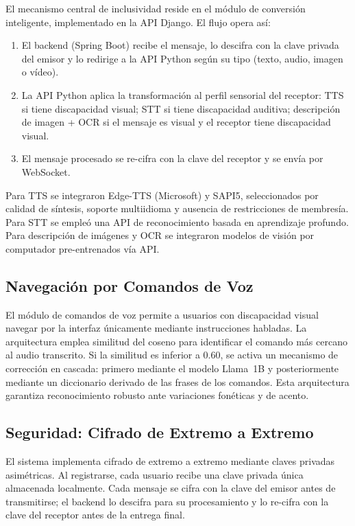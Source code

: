 \documentclass[journal]{IEEEtran}
\begin{document}
El mecanismo central de inclusividad reside en el m\'odulo de conversi\'on inteligente, implementado en la API Django. El flujo opera as\'i:

\begin{enumerate}
    \item El backend (Spring Boot) recibe el mensaje, lo descifra con la clave privada del emisor y lo redirige a la API Python seg\'un su tipo (texto, audio, imagen o v\'ideo).
    \item La API Python aplica la transformaci\'on al perfil sensorial del receptor: TTS si tiene discapacidad visual; STT si tiene discapacidad auditiva; descripci\'on de imagen + OCR si el mensaje es visual y el receptor tiene discapacidad visual.
    \item El mensaje procesado se re-cifra con la clave del receptor y se env\'ia por WebSocket.
\end{enumerate}

Para TTS se integraron Edge-TTS (Microsoft) y SAPI5, seleccionados por calidad de s\'intesis, soporte multiidioma y ausencia de restricciones de membres\'ia. Para STT se emple\'o una API de reconocimiento basada en aprendizaje profundo. Para descripci\'on de im\'agenes y OCR se integraron modelos de visi\'on por computador pre-entrenados v\'ia API.

\subsection{Navegaci\'on por Comandos de Voz}

El m\'odulo de comandos de voz permite a usuarios con discapacidad visual navegar por la interfaz \'unicamente mediante instrucciones habladas. La arquitectura emplea similitud del coseno \cite{lahitani2016} para identificar el comando m\'as cercano al audio transcrito. Si la similitud es inferior a 0.60, se activa un mecanismo de correcci\'on en cascada: primero mediante el modelo Llama~1B y posteriormente mediante un diccionario derivado de las frases de los comandos. Esta arquitectura garantiza reconocimiento robusto ante variaciones fon\'eticas y de acento.

\subsection{Seguridad: Cifrado de Extremo a Extremo}

El sistema implementa cifrado de extremo a extremo mediante claves privadas asim\'etricas. Al registrarse, cada usuario recibe una clave privada \'unica almacenada localmente. Cada mensaje se cifra con la clave del emisor antes de transmitirse; el backend lo descifra para su procesamiento y lo re-cifra con la clave del receptor antes de la entrega final.
\end{document}
